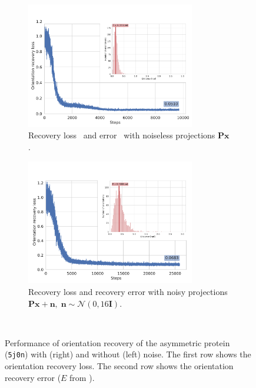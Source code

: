 \begin{figure}[ht!]
    \centering
    \begin{subfigure}[b]{0.45\textwidth}
        \includegraphics[height=5.5cm]{figures/5j0n_noise0_ar_aa}
        \caption{Recovery loss~ and error~ with noiseless projections $\mathbf{Px}$.}
    \end{subfigure}
    \hfill
    \begin{subfigure}[b]{0.5\textwidth}
    \centering
        \includegraphics[height=5.5cm]{figures/5j0n_noise16_ar_aa}
        \caption{Recovery loss and recovery error with noisy projections $\mathbf{Px+n}, \; \mathbf{n} \sim \mathcal{N}(0, 16\mathbf{I})$.}
    \end{subfigure}
    \\
    \caption{%
        Performance of orientation recovery of the asymmetric protein (\texttt{5j0n}) with (right) and without (left) noise.
        The first row shows the orientation recovery loss.
        The second row shows the orientation recovery error ($E$ from ).
    }\label{fig:5j0n-orientation-recovery-loss-est}
\end{figure}

